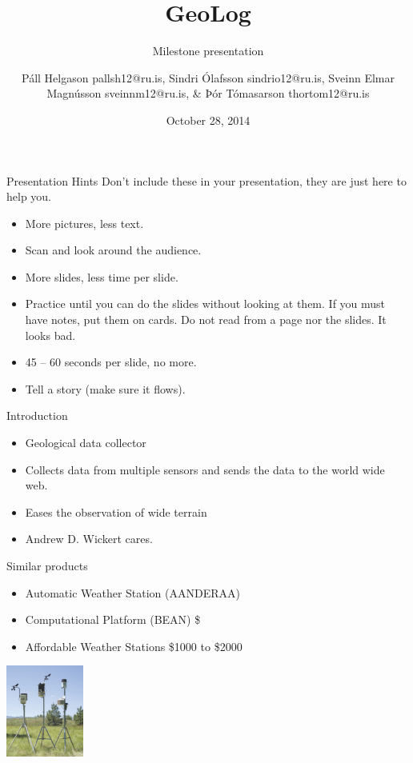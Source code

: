 \documentclass{beamer}
\title{GeoLog}
\subtitle{Milestone presentation}
\author[P. Helgasson, S. Ólafsson, S. Magnússon, \& Þ. Tómasarson]{Páll Helgason pallsh12@ru.is, Sindri Ólafsson sindrio12@ru.is, Sveinn Elmar Magnússon sveinnm12@ru.is, \& Þór Tómasarson thortom12@ru.is}
\institute[RU]{
  Department of Science and Engineering (TVD) \\
  Reykjavík University \\
}
\date{October 28, 2014} %
\begin{document}
\begin{frame}[plain]
  \titlepage
\end{frame}

\begin{frame}{Presentation Hints}
Don't include these in your presentation, they are just here to help you.
\begin{itemize}
\item More pictures, less text.
\item Scan and look around the audience.
\item More slides, less time per slide.
\item Practice until you can do the slides without looking at them.
  If you must have notes, put them on cards.  Do not read from a page
  nor the slides.  It looks bad.
\item 45 -- 60 seconds per slide, no more.
\item Tell a story (make sure it flows).
\end{itemize}
\end{frame}

\begin{frame}{Introduction}
\begin{itemize}
\item Geological data collector
\item Collects data from multiple sensors and sends the data to the world wide web. 
\item Eases the observation of wide terrain
\item Andrew D. Wickert cares.
\end{itemize}
\end{frame}

\begin{frame}{Similar products}
\begin{itemize}
\item Automatic Weather Station (AANDERAA) \cite{AANDERAA}
\item Computational Platform (BEAN) \$ \cite{BEAN}
\item Affordable Weather Stations \$1000 to \$2000 \cite{AffordableWS}
\end{itemize}
\centering
\includegraphics[height=3cm]{graphics/affordableWS.png}
\cite{AffordableWS}
\end{frame}
\end{document}

